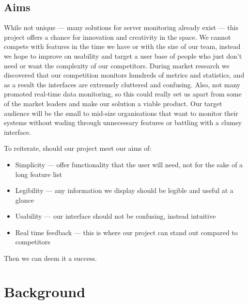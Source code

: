 \documentclass{l3proj}
\begin{document}
\section{Aims}
\label{aims}

While not unique --- many solutions for server monitoring already exist --- this project offers a chance for innovation and creativity in the space. We cannot compete with features in the time we have or with the size of our team, instead we hope to improve on usability and target a user base of people who just don’t need or want the complexity of our competitors. During market research we discovered that our competition monitors hundreds of metrics and statistics, and as a result the interfaces are extremely cluttered and confusing. Also, not many promoted real-time data monitoring, so this could really set us apart from some of the market leaders and make our solution a viable product. Our target audience will be the small to mid-size organisations that want to monitor their systems without wading through unnecessary features or battling with a clumsy interface.

To reiterate, should our project meet our aims of:

\begin{itemize}
  \item Simplicity --- offer functionality that the user will need, not for the sake of a long feature list
  \item Legibility --- any information we display should be legible and useful at a glance
  \item Usability --- our interface should not be confusing, instead intuitive
  \item Real time feedback --- this is where our project can stand out compared to competitors
\end{itemize}

Then we can deem it a success.



\chapter{Background}
\label{background}
\end{document}
